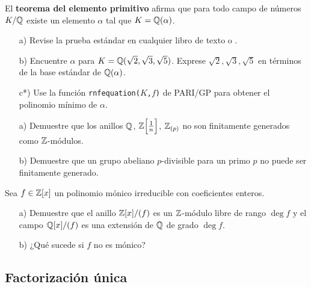 \begin{ejercicio}
  El \textbf{teorema del elemento primitivo} afirma que para todo campo
  de números $K/\mathbb{Q}$ existe un elemento $\alpha$ tal que $K = \mathbb{Q} (\alpha)$.

  \begin{enumerate}
  \item[a)] Revise la prueba estándar en cualquier libro de texto
    \cite[Chapter V, Theorem 4.6]{Lang-Algebra} o
    \cite[Chapter I, Theorem 5.6]{Morandi-GTM167}.

  \item[b)] Encuentre $\alpha$ para
    $K = \mathbb{Q} (\sqrt{2}, \sqrt{3}, \sqrt{5})$. Exprese
    $\sqrt{2}, \sqrt{3}, \sqrt{5}$ en términos de la base estándar de
    $\mathbb{Q} (\alpha)$.

  \item[c*)] Use la función \texttt{rnfequation($K$,$f$)} de PARI/GP para
    obtener el polinomio mínimo de $\alpha$.
  \end{enumerate}
\end{ejercicio}

\begin{ejercicio}
  \begin{enumerate}
  \item[a)] Demuestre que los anillos $\mathbb{Q}$, $\mathbb{Z} \Bigl[\frac{1}{n}\Bigr]$,
    $\mathbb{Z}_{(p)}$ no son finitamente generados como $\mathbb{Z}$-módulos.

  \item[b)] Demuestre que un grupo abeliano $p$-divisible para un primo $p$ no
    puede ser finitamente generado.
  \end{enumerate}
\end{ejercicio}

\begin{ejercicio}
  Sea $f \in \mathbb{Z} [x]$ un polinomio mónico irreducible con coeficientes enteros.

  \begin{enumerate}
    \item[a)] Demuestre que el anillo $\mathbb{Z} [x] / (f)$ es un $\mathbb{Z}$-módulo libre
      de rango $\deg f$ y el campo $\mathbb{Q} [x] / (f)$ es una extensión de $\mathbb{Q}$ de
      grado $\deg f$.

    \item[b)] ¿Qué sucede si $f$ no es mónico?
  \end{enumerate}
\end{ejercicio}

\subsection*{Factorización única}

